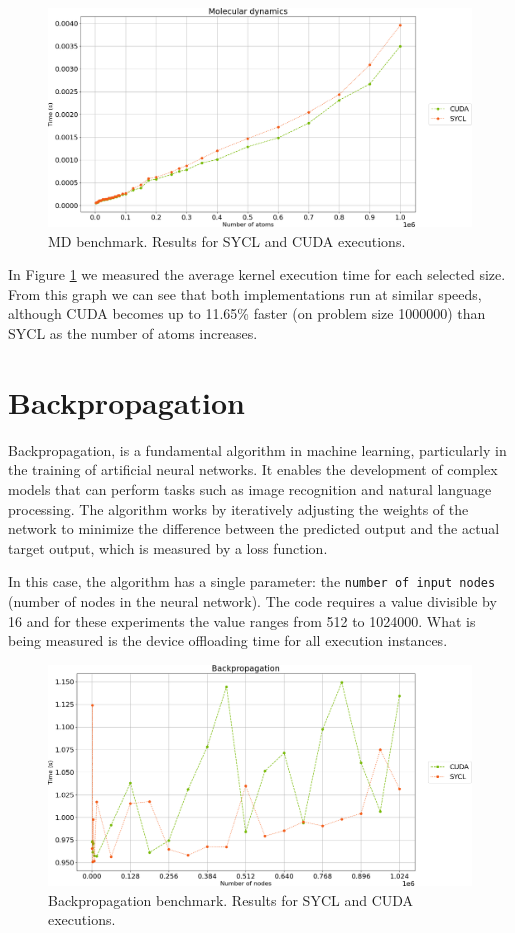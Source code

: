 \begin{figure}[H]
	\centering
	\includegraphics[width=\linewidth]{images/md-sycl-cuda.png}
	\caption{MD benchmark. Results for SYCL and CUDA executions.}
	\label{fig:md-sycl-cuda}
\end{figure}

In Figure \ref{fig:md-sycl-cuda} we measured the average kernel execution time for each selected size.
From this graph we can see that both implementations run at similar speeds, although CUDA becomes up to 11.65\% faster (on problem size 1000000) than SYCL as the number of atoms increases.

\section{Backpropagation}
Backpropagation, is a fundamental algorithm in machine learning, particularly in the training of artificial neural networks.
It enables the development of complex models that can perform tasks such as image recognition and natural language processing.
The algorithm works by iteratively adjusting the weights of the network to minimize the difference between the predicted output and the actual target output, which is measured by a loss function.

In this case, the algorithm has a single parameter: the \texttt{number of input nodes} (number of nodes in the neural network). The code requires a value divisible by 16 and for these experiments the value ranges from 512 to 1024000. 
What is being measured is the device offloading time for all execution instances.

\begin{figure}[H]
	\centering
	\includegraphics[width=\linewidth]{images/backprop-sycl-cuda.png}
	\caption{Backpropagation benchmark. Results for SYCL and CUDA executions.}
	\label{fig:backprop-sycl-cuda}
\end{figure}

